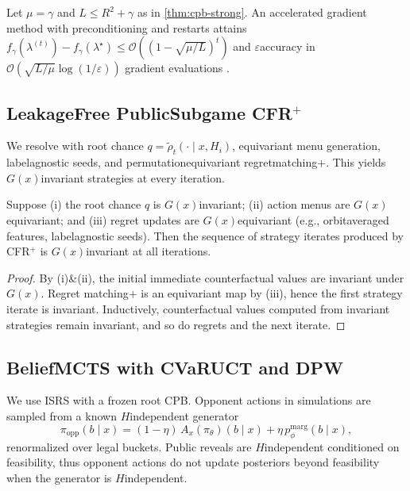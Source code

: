 \begin{proposition}\label{prop:accel}
Let $\mu=\gamma$ and $L\le R^2+\gamma$ as in \cref{thm:cpb-strong}. An accelerated gradient method with preconditioning and restarts attains $f_\gamma(\lambda^{(t)})-f_\gamma(\lambda^\star)\le \mathcal{O}\!\left((1-\sqrt{\mu/L})^{t}\right)$ and $\varepsilon$\textendash accuracy in $\mathcal{O}\!\left(\sqrt{L/\mu}\log(1/\varepsilon)\right)$ gradient evaluations \cite{nesterov2004introductory}.
\end{proposition}

\subsection{Leakage\textendash Free Public\textendash Subgame CFR$^+$}
We re\textendash solve with root chance $q=\tilde\rho_t(\cdot\mid x,H_i)$, equivariant menu generation, label\textendash agnostic seeds, and permutation\textendash equivariant regret\textendash matching$+$. This yields $G(x)$\textendash invariant strategies at every iteration.

\begin{theorem}\label{thm:symm}
Suppose (i) the root chance $q$ is $G(x)$\textendash invariant; (ii) action menus are $G(x)$\textendash equivariant; and (iii) regret updates are $G(x)$\textendash equivariant (e.g., orbit\textendash averaged features, label\textendash agnostic seeds). Then the sequence of strategy iterates produced by CFR$^+$ is $G(x)$\textendash invariant at all iterations.
\end{theorem}
\begin{proof}
By (i)\&(ii), the initial immediate counterfactual values are invariant under $G(x)$. Regret matching$+$ is an equivariant map by (iii), hence the first strategy iterate is invariant. Inductively, counterfactual values computed from invariant strategies remain invariant, and so do regrets and the next iterate.
\end{proof}

\subsection{Belief\textendash MCTS with CVaR\textendash UCT and DPW}
We use IS\textendash RS with a frozen root CPB. Opponent actions in simulations are sampled from a known $H$\textendash independent generator
\[
\pi_{\mathrm{opp}}(b\mid x)=(1-\eta)\,A_x(\pi_\theta)(b\mid x)+\eta\,p_\phi^{\mathrm{marg}}(b\mid x),
\]
renormalized over legal buckets. Public reveals are $H$\textendash independent conditioned on feasibility, thus opponent actions do not update posteriors beyond feasibility when the generator is $H$\textendash independent.

